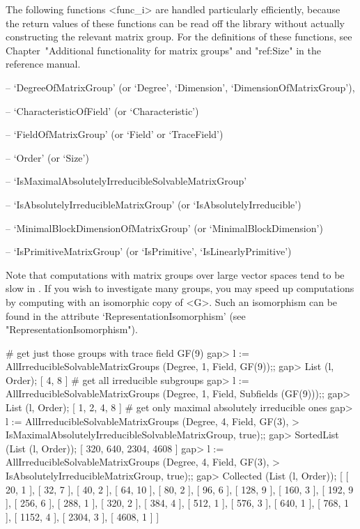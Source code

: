 The following functions <func_i> are handled particularly efficiently, because the
return values of these functions can be read off the
{\IRREDSOL} library without actually constructing the relevant matrix group. For the
definitions of these functions, see Chapter~"Additional functionality for matrix
groups" and "ref:Size" in the {\GAP} reference manual.

\beginlist

\item{--} `DegreeOfMatrixGroup' (or `Degree', `Dimension', `DimensionOfMatrixGroup'), 
\item{--} `CharacteristicOfField' (or `Characteristic')
\item{--} `FieldOfMatrixGroup' (or `Field' or `TraceField')
\item{--} `Order' (or `Size')
\item{--} `IsMaximalAbsolutelyIrreducibleSolvableMatrixGroup' 
\item{--} `IsAbsolutelyIrreducibleMatrixGroup' (or `IsAbsolutelyIrreducible')
\item{--} `MinimalBlockDimensionOfMatrixGroup' (or `MinimalBlockDimension')
\item{--} `IsPrimitiveMatrixGroup' (or `IsPrimitive', `IsLinearlyPrimitive')

\endlist
Note that computations with matrix groups over large vector spaces tend to be slow in {\GAP}. 
If you wish to investigate many groups, you may speed up computations by computing with
an isomorphic copy of <G>. Such an isomorphism can be found in the attribute 
`RepresentationIsomorphism' (see "RepresentationIsomorphism").

\beginexample
# get just those groups with trace field GF(9)
gap> l := AllIrreducibleSolvableMatrixGroups (Degree, 1, Field, GF(9));;
gap> List (l, Order);
[ 4, 8 ]
# get all irreducible subgroups
gap> l := AllIrreducibleSolvableMatrixGroups (Degree, 1, Field, Subfields (GF(9)));;
gap> List (l, Order);
[ 1, 2, 4, 8 ]
# get only maximal absolutely irreducible ones
gap> l := AllIrreducibleSolvableMatrixGroups (Degree, 4, Field, GF(3),
>             IsMaximalAbsolutelyIrreducibleSolvableMatrixGroup, true);;
gap> SortedList (List (l, Order));
[ 320, 640, 2304, 4608 ]
gap> l := AllIrreducibleSolvableMatrixGroups (Degree, 4, Field, GF(3),
> IsAbsolutelyIrreducibleMatrixGroup, true);;
gap> Collected (List (l, Order));
[ [ 20, 1 ], [ 32, 7 ], [ 40, 2 ], [ 64, 10 ], [ 80, 2 ], [ 96, 6 ], 
  [ 128, 9 ], [ 160, 3 ], [ 192, 9 ], [ 256, 6 ], [ 288, 1 ], [ 320, 2 ], 
  [ 384, 4 ], [ 512, 1 ], [ 576, 3 ], [ 640, 1 ], [ 768, 1 ], [ 1152, 4 ], 
  [ 2304, 3 ], [ 4608, 1 ] ]
\endexample

